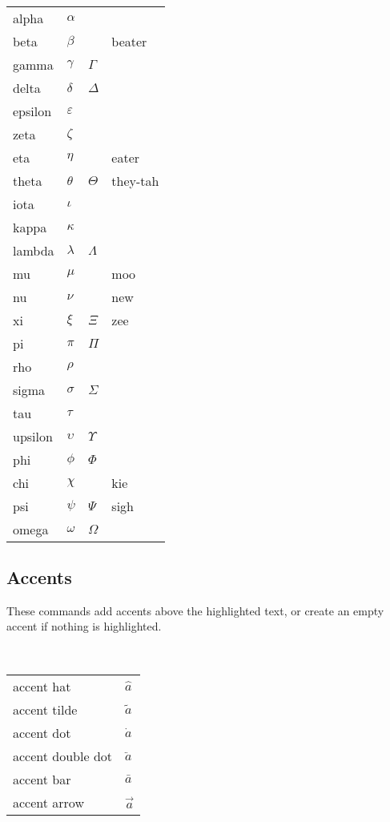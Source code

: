 \documentclass[12pt]{article}
\begin{document}
\


\begin{longtable}{llll}
alpha & $\alpha$ & & \\
beta & $\beta$ &  & beater \\
gamma & $\gamma$ & $\Gamma$ & \\
delta & $\delta$ & $\Delta$ & \\
epsilon & $\varepsilon$ & & \\
zeta & $\zeta$ & & \\
eta & $\eta$ & & eater \\
theta & $\theta$ & $\Theta$ & they-tah \\
iota & $\iota$ & & \\
kappa & $\kappa$ & & \\
lambda & $\lambda$ & $\Lambda$ & \\
mu & $\mu$ & & moo \\
nu & $\nu$ & & new \\
xi & $\xi$ & $\Xi$ & zee \\
pi & $\pi$ & $\Pi$ & \\
rho & $\rho$ & & \\
sigma & $\sigma$ & $\Sigma$ & \\
tau & $\tau$ & & \\
upsilon & $\upsilon$ & $\Upsilon$ & \\
phi & $\phi$ & $\Phi$ & \\
chi & $\chi$ & & kie \\
psi & $\psi$ & $\Psi$ & sigh \\
omega & $\omega$ & $\Omega$ & \\
\end{longtable}


\subsection{Accents}
These commands add accents above the highlighted text, or create an empty accent if nothing is highlighted.

\

\begin{longtable}{ l l}
accent hat & $\hat{a}$ \\
accent tilde & $\tilde{a}$ \\
accent dot & $\dot{a}$ \\
accent double dot & $\ddot{a}$ \\
accent bar & $\bar{a}$ \\
accent arrow & $\vec{a}$ \\
\end{longtable}
\end{document}
